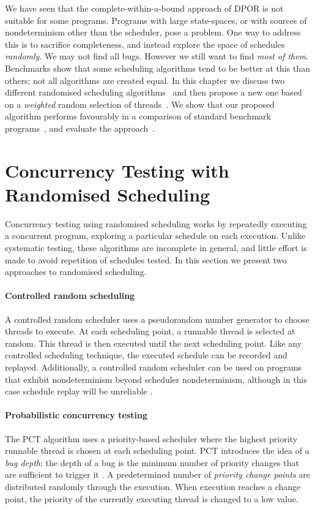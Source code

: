 We have seen that the complete-within-a-bound approach of DPOR is not
suitable for some programs.  Programs with large state-spaces, or with
sources of nondeterminism other than the scheduler, pose a problem.
One way to address this is to sacrifice completeness, and instead
explore the space of schedules \emph{randomly}.  We may not find all
bugs.  However we still want to find \emph{most of them}.  Benchmarks
show that some scheduling algorithms tend to be better at this than
others; not all algorithms are created equal.  In this chapter we
discuss two different randomised scheduling
algorithms~ and then propose a new one based on
a \emph{weighted} random selection of threads~.
We show that our proposed algorithm performs favourably in a
comparison of standard benchmark programs~, and
evaluate the approach~.

\section{Concurrency Testing with Randomised Scheduling}
\label{sec:algorithms-usual}

Concurrency testing using randomised scheduling works by repeatedly
executing a concurrent program, exploring a particular schedule on
each execution.  Unlike systematic testing, these algorithms are
incomplete in general, and little effort is made to avoid repetition
of schedules tested.  In this section we present two approaches to
randomised scheduling.

\paragraph{Controlled random scheduling}
A controlled random scheduler uses a pseudorandom number generator to
choose threads to execute.  At each scheduling point, a runnable
thread is selected at random.  This thread is then executed until the
next scheduling point.  Like any controlled scheduling technique, the
executed schedule can be recorded and replayed.  Additionally, a
controlled random scheduler can be used on programs that exhibit
nondeterminism beyond scheduler nondeterminism, although in this case
schedule replay will be unreliable \parencite{thomson2016}.

\paragraph{Probabilistic concurrency testing}
The PCT algorithm \parencite{burckhardt2010} uses a priority-based scheduler
where the highest priority runnable thread is chosen at each
scheduling point.  PCT introduces the idea of a \emph{bug depth}: the
depth of a bug is the minimum number of priority changes that are
sufficient to trigger it \parencite{burckhardt2010}.  A predetermined number
of \emph{priority change points} are distributed randomly through the
execution.  When execution reaches a change point, the priority of the
currently executing thread is changed to a low value.

